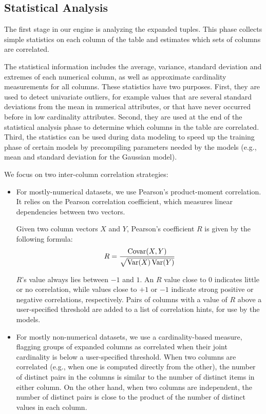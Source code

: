\subsection{Statistical Analysis}
\label{sec:statistical-analysis}

The first stage in our engine is analyzing the expanded tuples.
This phase collects simple statistics on each column of the table and estimates which sets of columns are correlated.

The statistical information includes the average, variance, standard deviation and extremes of each numerical column, as well as approximate cardinality measurements for all columns. These statistics have two purposes. 
First, they are used to detect univariate outliers, for example values that are several standard deviations from the mean in numerical attributes, or that have never occurred before in low cardinality attributes.
Second, they are used at the end of the statistical analysis phase to determine which columns in the table are correlated. 
Third, the statistics can be used during data modeling to speed up the training phase of certain models by precompiling parameters needed by the models (e.g., mean and standard deviation for the Gaussian model).

We focus on two inter-column correlation strategies:

\begin{itemize}
\item For mostly-numerical datasets, we use Pearson's product-moment
  correlation. It relies on the Pearson correlation coefficient,
  which measures linear dependencies between two vectors.

  Given two column vectors $X$ and $Y$, Pearson's coefficient $R$ is given by the following formula:
  \begin{align}
    \label{eqn:pearson}
    R = \frac{\Covar(X,Y)}{\sqrt{\Var(X)\Var(Y)}}
  \end{align}

  $R$'s value always lies between $-1$ and $1$. An $R$ value close to 0 indicates little or no correlation, while values close to $+1$ or $-1$ indicate strong positive or negative correlations, respectively. Pairs of columns with a value of \(R\) above a user-specified threshold are added to a list of correlation hints, for use by the models.

\item For mostly non-numerical datasets, we use a cardinality-based measure, flagging groups of expanded columns as correlated when their joint cardinality is below a user-specified threshold. When two columns are correlated (e.g., when one is computed directly from the other), the number of distinct pairs in the columns is similar to the number of distinct items in either column. On the other hand, when two columns are independent, the number of distinct pairs is close to the product of the number of distinct values in each column.
\end{itemize}

